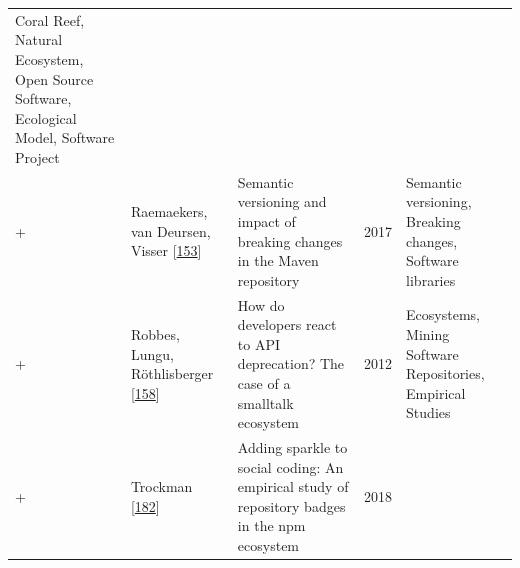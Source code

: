 \documentclass[]{book}
\begin{document}
\begin{longtable}[]{@{}lllll@{}}
\begin{minipage}[t]{0.39\columnwidth}
Coral Reef, Natural Ecosystem, Open Source Software, Ecological Model,
Software Project\strut
\end{minipage}\tabularnewline
\begin{minipage}[t]{0.01\columnwidth}\raggedright\strut
+\strut
\end{minipage} & \begin{minipage}[t]{0.09\columnwidth}\raggedright\strut
Raemaekers, van Deursen, Visser
{[}\protect\hyperlink{ref-Raemaekers2017}{153}{]}\strut
\end{minipage} & \begin{minipage}[t]{0.34\columnwidth}\raggedright\strut
Semantic versioning and impact of breaking changes in the Maven
repository\strut
\end{minipage} & \begin{minipage}[t]{0.02\columnwidth}\raggedright\strut
2017\strut
\end{minipage} & \begin{minipage}[t]{0.39\columnwidth}\raggedright\strut
Semantic versioning, Breaking changes, Software libraries\strut
\end{minipage}\tabularnewline
\begin{minipage}[t]{0.01\columnwidth}\raggedright\strut
+\strut
\end{minipage} & \begin{minipage}[t]{0.09\columnwidth}\raggedright\strut
Robbes, Lungu, Röthlisberger
{[}\protect\hyperlink{ref-Robbes2012}{158}{]}\strut
\end{minipage} & \begin{minipage}[t]{0.34\columnwidth}\raggedright\strut
How do developers react to API deprecation? The case of a smalltalk
ecosystem\strut
\end{minipage} & \begin{minipage}[t]{0.02\columnwidth}\raggedright\strut
2012\strut
\end{minipage} & \begin{minipage}[t]{0.39\columnwidth}\raggedright\strut
Ecosystems, Mining Software Repositories, Empirical Studies\strut
\end{minipage}\tabularnewline
\begin{minipage}[t]{0.01\columnwidth}\raggedright\strut
+\strut
\end{minipage} & \begin{minipage}[t]{0.09\columnwidth}\raggedright\strut
Trockman {[}\protect\hyperlink{ref-Trockman2018}{182}{]}\strut
\end{minipage} & \begin{minipage}[t]{0.34\columnwidth}\raggedright\strut
Adding sparkle to social coding: An empirical study of repository badges
in the npm ecosystem\strut
\end{minipage} & \begin{minipage}[t]{0.02\columnwidth}\raggedright\strut
2018\strut
\end{minipage} & \begin{minipage}[t]{0.39\columnwidth}\raggedright\strut
\strut
\end{minipage}\tabularnewline
\bottomrule
\end{longtable}
\end{document}
